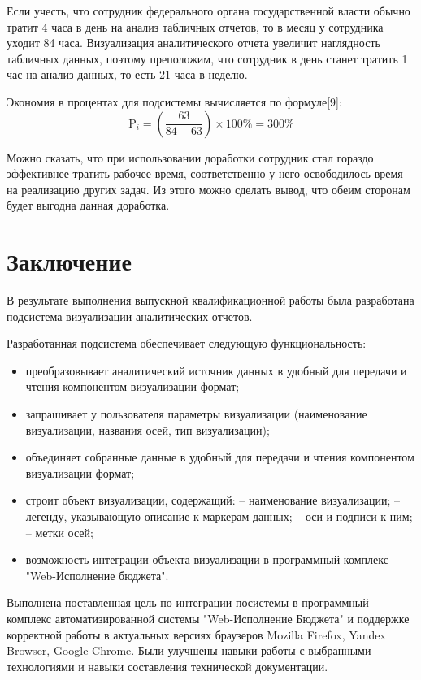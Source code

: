 \documentclass[a4paper]{extarticle}
\numberwithin{equation}{section}
\begin{document}
Если учесть, что сотрудник федерального органа государственной власти обычно тратит 4 часа в день на анализ табличных отчетов, то в месяц у сотрудника уходит 84 часа. Визуализация аналитического отчета увеличит наглядность табличных данных, поэтому преположим, что сотрудник в день станет тратить 1 час на анализ данных, то есть 21 часа в неделю.\par
Экономия в процентах для подсистемы вычисляется по формуле[9]:
\begin{equation}
\label{form22}
	\text{P}_i=(\frac{63}{84-63})\times 100\%=300\%
\end{equation}\par
Можно сказать, что при использовании доработки сотрудник стал гораздо эффективнее тратить рабочее время, соответственно у него освободилось время на реализацию других задач. Из этого можно сделать вывод, что обеим сторонам будет выгодна данная доработка.

\newpage
\section*{Заключение}
В результате выполнения выпускной квалификационной работы была разработана подсистема визуализации аналитических отчетов.\par
Разработанная подсистема обеспечивает следующую функциональность:\par
\begin{itemize}
  \item преобразовывает аналитический источник данных в удобный для передачи и чтения компонентом визуализации формат;
  \item запрашивает у пользователя параметры визуализации (наименование визуализации, названия осей, тип визуализации);
  \item объединяет собранные данные в удобный для передачи и чтения компонентом визуализации формат;
  \item строит объект визуализации, содержащий:\newline
    	\hspace*{2.5cm} – наименование визуализации;\newline
        \hspace*{2.5cm} – легенду, указывающую описание к маркерам данных;\newline
    	\hspace*{2.5cm} – оси и подписи к ним;\newline
        \hspace*{2.5cm} – метки осей;
  \item возможность интеграции объекта визуализации в программный комплекс "Web-Исполнение бюджета".
\end{itemize}\par
Выполнена поставленная цель по интеграции посистемы в программный комплекс автоматизированной системы "Web-Исполнение Бюджета" и поддержке корректной работы в актуальных версиях браузеров Mozilla Firefox, Yandex Browser, Google Chrome. Были улучшены навыки работы с выбранными технологиями и навыки составления технической документации.
\end{document}

